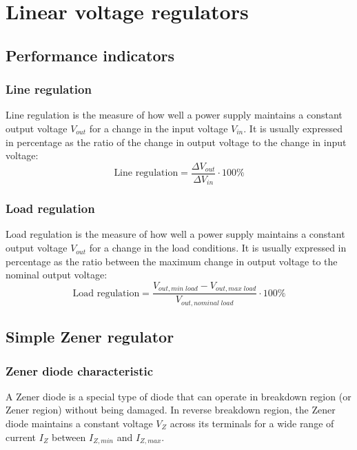 \section{Linear voltage regulators}
\subsection{Performance indicators}
\subsubsection*{Line regulation}
Line regulation is the measure of how well a power supply maintains a constant output voltage \(V_{out}\) for a change in the
input voltage \(V_{in}\). It is usually expressed in percentage as the ratio of the change in output voltage to the change in
input voltage:
\[\text{Line regulation} = \frac{\Delta V_{out}}{\Delta V_{in}} \cdot 100\%\]

\subsubsection*{Load regulation}
Load regulation is the measure of how well a power supply maintains a constant output voltage \(V_{out}\) for a change in the load
conditions. It is usually expressed in percentage as the ratio between the maximum change in output voltage to the nominal output
voltage:
\[\text{Load regulation} = \frac{V_{out, min \; load} - V_{out, max \; load}}{V_{out, nominal \; load}} \cdot 100\%\]

\subsection{Simple Zener regulator}
\subsubsection*{Zener diode characteristic}
A Zener diode is a special type of diode that can operate in breakdown region (or Zener region) without being damaged. In reverse
breakdown region, the Zener diode maintains a constant voltage \(V_Z\) across its terminals for a wide range of current \(I_Z\)
between \(I_{Z,min}\) and \(I_{Z,max}\).

